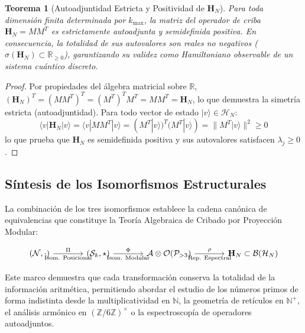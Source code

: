 \documentclass{article}
\numberwithin{equation}{section}
\theoremstyle{plain}
\newtheorem{theorem}{Teorema}[section]
\theoremstyle{definition}
\begin{document}
\begin{theorem}[Autoadjuntidad Estricta y Positividad de $\mathbf{H}_N$]
\label{thm:autoadjunto}
Para toda dimensión finita determinada por $k_{\max}$, la matriz del operador de criba $\mathbf{H}_N = M M^T$ es estrictamente autoadjunta y semidefinida positiva. En consecuencia, la totalidad de sus autovalores son reales no negativos ($\sigma(\mathbf{H}_N) \subset \mathbb{R}_{\ge 0}$), garantizando su validez como Hamiltoniano observable de un sistema cuántico discreto.
\end{theorem}

\begin{proof}
Por propiedades del álgebra matricial sobre $\mathbb{R}$, $(\mathbf{H}_N)^T = (M M^T)^T = (M^T)^T M^T = M M^T = \mathbf{H}_N$, lo que demuestra la simetría estricta (autoadjuntidad). Para todo vector de estado $|v\rangle \in \mathcal{H}_N$:
\begin{equation}
\langle v | \mathbf{H}_N | v \rangle = \langle v | M M^T | v \rangle = (M^T |v\rangle)^T (M^T |v\rangle) = \|M^T |v\rangle\|^2 \ge 0
\end{equation}
lo que prueba que $\mathbf{H}_N$ es semidefinida positiva y sus autovalores satisfacen $\lambda_j \ge 0$.
\end{proof}

\subsection{Síntesis de los Isomorfismos Estructurales}

La combinación de los tres isomorfismos establece la cadena canónica de equivalencias que constituye la Teoría Algebraica de Cribado por Proyección Modular:

\begin{equation}
\begin{tikzcd}[column sep=large, row sep=large]
(\mathcal{N}, \cdot) \arrow[r, "\Pi", "\text{Isom. Posicional}"'] 
& (\mathcal{S}_k, \star) \arrow[r, "\Phi", "\text{Isom. Modular}"'] 
& \mathcal{A} \otimes \mathcal{O}(\mathcal{P}_{>3}) \arrow[r, "\rho", "\text{Rep. Espectral}"'] 
& \mathbf{H}_N \subset \mathcal{B}(\mathcal{H}_N)
\end{tikzcd}
\end{equation}

Este marco demuestra que cada transformación conserva la totalidad de la información aritmética, permitiendo abordar el estudio de los números primos de forma indistinta desde la multiplicatividad en $\mathbb{N}$, la geometría de retículos en $\mathbb{N}^+$, el análisis armónico en $(\mathbb{Z}/6\mathbb{Z})^\times$ o la espectroscopía de operadores autoadjuntos.
\end{document}
